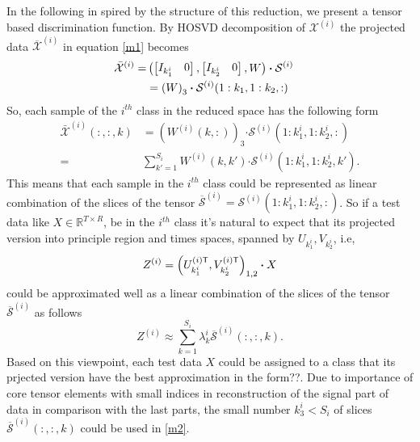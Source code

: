 \documentclass[journal]{IEEEtran}
\begin{document}
	In the following  in spired by the structure of this reduction, we present a tensor based discrimination function.
	By HOSVD decomposition of
	$\mathcal{X}^{(i)}$ the projected data $\overline{\mathcal{X}}^{(i)}$ in equation \eqref{m1} becomes
	\begin{align}
	\bar{\mathcal{X}}^{(i)}= & \notag
	\left(
	\begin{bmatrix}
	I_{k_1^i} &  0
	\end{bmatrix},
	\begin{bmatrix}
	I_{k_2^i} &  0
	\end{bmatrix},
	W
	\right)\boldsymbol{\cdot} \mathcal{S}^{(i)} \notag
	\\&=\left( 
	W
	\right)_{3} \boldsymbol{\cdot} \mathcal{S}^{(i)}(1:k_1, 1:k_2, :) \notag &
	\end{align}
	So,  each sample of the $i^{th}$ class in the reduced space has the following form
	\begin{align*}
	\bar{{\mathcal{X}}}^{(i)}(:,:,k) &= \left(  
	W^{(i)}(k,:)
	\right)_{3} \boldsymbol{\cdot} \mathcal{S}^{(i)}(1:k_1^i, 1:k_2^i, :)\\
	=& \sum_{k' = 1}^{S_i} W^{(i)}(k,k') \boldsymbol{\cdot} \mathcal{S}^{(i)}(1:k_1^i, 1:k_2^i, k').
	\end{align*}
	This means that each sample in the $i^{th}$ class could be represented as linear combination of the slices  of the tensor $\overline{\mathcal{S}}^{(i)}=\mathcal{S}^{(i)}(1:k_1^i, 1:k_2^i, :)$.
	So if a test data like $X\in \mathbb{R}^{T\times R}$, be in the $i^{th}$ class
	it's natural to expect that its
	projected version into principle region and times spaces, spanned by $U_{k_1^i},V_{k_2^i}$, i.e,
	\[
	Z^{(i)}= \left( U_{k_1^i}^{(i)\sf T}, V_{k_2^i}^{(i)\sf T} 
	\right)_{1,2}\boldsymbol{\cdot} X
	\]
	could be approximated well as a linear combination of the slices of the tensor $\overline{\mathcal{S}}^{(i)}$ as follows
	\begin{equation}
	\label{m2}
	Z^{(i)} \approx \sum_{k=1}^{S_i} \lambda_k^i \overline{\mathcal{S}}^{(i)}(:,:,k).
	\end{equation}
	Based on this viewpoint, each test data $X$ could be assigned to a class that its prjected version have the best approximation in the form??. 
	Due to importance of core tensor elements with small indices in reconstruction of the signal part of data in comparison with the last parts,
	the small number $k_3^i< S_i$  of slices $\overline{\mathcal{S}}^{(i)}(:,:,k)$ could be used  in  \eqref{m2}. 
	
\end{document}
